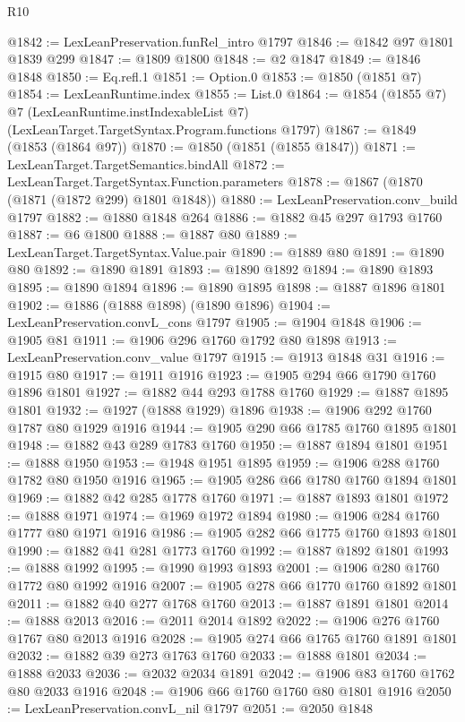 \begin{lexlean}{R10}
\begin{coremodule}
@1842 := LexLeanPreservation.funRel_intro @1797
@1846 := @1842 @97 @1801 @1839 @299
@1847 := @1809 @1800
@1848 := @2 @1847
@1849 := @1846 @1848
@1850 := Eq.refl.{1}
@1851 := Option.{0}
@1853 := @1850 (@1851 @7)
@1854 := LexLeanRuntime.index
@1855 := List.{0}
@1864 := @1854
    (@1855 @7)
    @7
    (LexLeanRuntime.instIndexableList @7)
    (LexLeanTarget.TargetSyntax.Program.functions @1797)
@1867 := @1849 (@1853 (@1864 @97))
@1870 := @1850 (@1851 (@1855 @1847))
@1871 := LexLeanTarget.TargetSemantics.bindAll
@1872 := LexLeanTarget.TargetSyntax.Function.parameters
@1878 := @1867 (@1870 (@1871 (@1872 @299) @1801 @1848))
@1880 := LexLeanPreservation.conv_build @1797
@1882 := @1880 @1848 @264
@1886 := @1882 @45 @297 @1793 @1760
@1887 := @6 @1800
@1888 := @1887 @80
@1889 := LexLeanTarget.TargetSyntax.Value.pair
@1890 := @1889 @80
@1891 := @1890 @80
@1892 := @1890 @1891
@1893 := @1890 @1892
@1894 := @1890 @1893
@1895 := @1890 @1894
@1896 := @1890 @1895
@1898 := @1887 @1896 @1801
@1902 := @1886 (@1888 @1898) (@1890 @1896)
@1904 := LexLeanPreservation.convL_cons @1797
@1905 := @1904 @1848
@1906 := @1905 @81
@1911 := @1906 @296 @1760 @1792 @80 @1898
@1913 := LexLeanPreservation.conv_value @1797
@1915 := @1913 @1848 @31
@1916 := @1915 @80
@1917 := @1911 @1916
@1923 := @1905 @294 @66 @1790 @1760 @1896 @1801
@1927 := @1882 @44 @293 @1788 @1760
@1929 := @1887 @1895 @1801
@1932 := @1927 (@1888 @1929) @1896
@1938 := @1906 @292 @1760 @1787 @80 @1929 @1916
@1944 := @1905 @290 @66 @1785 @1760 @1895 @1801
@1948 := @1882 @43 @289 @1783 @1760
@1950 := @1887 @1894 @1801
@1951 := @1888 @1950
@1953 := @1948 @1951 @1895
@1959 := @1906 @288 @1760 @1782 @80 @1950 @1916
@1965 := @1905 @286 @66 @1780 @1760 @1894 @1801
@1969 := @1882 @42 @285 @1778 @1760
@1971 := @1887 @1893 @1801
@1972 := @1888 @1971
@1974 := @1969 @1972 @1894
@1980 := @1906 @284 @1760 @1777 @80 @1971 @1916
@1986 := @1905 @282 @66 @1775 @1760 @1893 @1801
@1990 := @1882 @41 @281 @1773 @1760
@1992 := @1887 @1892 @1801
@1993 := @1888 @1992
@1995 := @1990 @1993 @1893
@2001 := @1906 @280 @1760 @1772 @80 @1992 @1916
@2007 := @1905 @278 @66 @1770 @1760 @1892 @1801
@2011 := @1882 @40 @277 @1768 @1760
@2013 := @1887 @1891 @1801
@2014 := @1888 @2013
@2016 := @2011 @2014 @1892
@2022 := @1906 @276 @1760 @1767 @80 @2013 @1916
@2028 := @1905 @274 @66 @1765 @1760 @1891 @1801
@2032 := @1882 @39 @273 @1763 @1760
@2033 := @1888 @1801
@2034 := @1888 @2033
@2036 := @2032 @2034 @1891
@2042 := @1906 @83 @1760 @1762 @80 @2033 @1916
@2048 := @1906 @66 @1760 @1760 @80 @1801 @1916
@2050 := LexLeanPreservation.convL_nil @1797
@2051 := @2050 @1848

\end{coremodule}
\end{lexlean}
